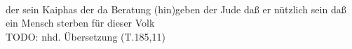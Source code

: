 \begin{exe}
\ex \label{ex:T37308} \gll {}                      \\
{der} {sein} {Kaiphas} {der} {da} {Beratung} {(hin)geben} {der} {Jude} {} {daß} {er} {nützlich} {sein} {daß} {ein} {Mensch} {sterben} {für} {dieser} {Volk} {}\\
\glt TODO: nhd. Übersetzung (T.185,11)
\end{exe}
